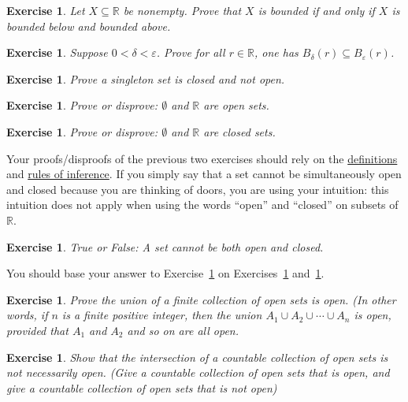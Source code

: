 \documentclass{book}
\newcounter{ekcounter}%
\theoremstyle{ekimcustom}
\newtheorem{exercise}[ekcounter]{Exercise}
\begin{document}
\begin{exercise}
Let $X \subseteq \mathbb{R}$ be nonempty.  Prove that $X$ is bounded if and only if $X$ is bounded below and bounded above.
\end{exercise}

\begin{exercise}
Suppose $0 < \delta < \varepsilon$. Prove for all $r \in \mathbb{R}$, one has $B_{\delta}(r) \subseteq B_{\varepsilon}(r)$.
\end{exercise}

\begin{exercise}
Prove a singleton set is closed and not open.
\end{exercise}

\begin{exercise}\label{exercise:nullR-open}
Prove or disprove: $\emptyset$ and $\mathbb{R}$ are open sets.
\end{exercise}

\begin{exercise}\label{exercise:nullR-closed}
Prove or disprove: $\emptyset$ and $\mathbb{R}$ are closed sets.
\end{exercise}

Your proofs/disproofs of the previous two exercises  should rely on the \underline{definitions} and \underline{rules of inference}. If you simply say that a set cannot be simultaneously open and closed because you are thinking of doors, you are using your intuition: this intuition does not apply when using the words ``open'' and ``closed'' on subsets of $\mathbb{R}$.

\begin{exercise}\label{exercise:TF-clopen}
True or False: A set cannot be both open and closed.
\end{exercise}
You should base your answer to Exercise~\ref{exercise:TF-clopen} on Exercises~\ref{exercise:nullR-open} and~\ref{exercise:nullR-closed}.

\begin{exercise}
Prove the union of a finite collection of open sets is open. (In other words, if $n$ is a finite positive integer, then the union $A_1 \cup A_2 \cup \cdots \cup A_n$ is open, provided that $A_1$ and $A_2$ and so on are all open.
\end{exercise}

\begin{exercise}
Show that the intersection of a countable collection of open sets is not necessarily open.  (Give a countable collection of open sets that is open, and give a countable collection of open sets that is not open)
\end{exercise}
\end{document}
